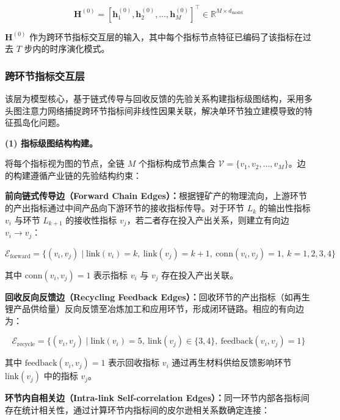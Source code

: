 \begin{equation}
\mathbf{H}^{(0)} = \left[\mathbf{h}_1^{(0)},\mathbf{h}_2^{(0)},\ldots,\mathbf{h}_M^{(0)}\right]^{\top} \in \mathbb{R}^{M \times d_{\text{model}}}
\end{equation}

$\mathbf{H}^{(0)}$ 作为跨环节指标交互层的输入，其中每个指标节点特征已编码了该指标在过去 $T$ 步内的时序演化模式。

\subsubsection{跨环节指标交互层}

该层为模型核心，基于链式传导与回收反馈的先验关系构建指标级图结构，采用多头图注意力网络捕捉跨环节指标间非线性因果关联，解决单环节独立建模导致的特征孤岛化问题。

\textbf{(1) 指标级图结构构建。}

将每个指标视为图的节点，全链 $M$ 个指标构成节点集合 $\mathcal{V}=\{v_1,v_2,\ldots,v_M\}$。边的构建遵循产业链的先验结构约束：

\textbf{前向链式传导边（Forward Chain Edges）：}根据锂矿产的物理流向，上游环节的产出指标通过中间产品向下游环节的接收指标传导。对于环节 $L_k$ 的输出性指标 $v_i$ 与环节 $L_{k+1}$ 的接收性指标 $v_j$，若二者存在投入产出关系，则建立有向边 $v_i\to v_j$：

\begin{equation}
\mathcal{E}_{\text{forward}} = \{(v_i, v_j) \mid \text{link}(v_i)=k,\ \text{link}(v_j)=k+1,\ \text{conn}(v_i,v_j)=1,\ k=1,2,3,4\}
\end{equation}

其中 $\text{conn}(v_i,v_j)=1$ 表示指标 $v_i$ 与 $v_j$ 存在投入产出关联。

\textbf{回收反向反馈边（Recycling Feedback Edges）：}回收环节的产出指标（如再生锂产品供给量）反向反馈至冶炼加工和应用环节，形成闭环链路。相应的有向边为：

\begin{equation}
\mathcal{E}_{\text{recycle}} = \{(v_i, v_j) \mid \text{link}(v_i)=5,\ \text{link}(v_j)\in\{3,4\},\ \text{feedback}(v_i,v_j)=1\}
\end{equation}

其中 $\text{feedback}(v_i,v_j)=1$ 表示回收指标 $v_i$ 通过再生材料供给反馈影响环节 $\text{link}(v_j)$ 中的指标 $v_j$。

\textbf{环节内自相关边（Intra-link Self-correlation Edges）：}同一环节内部各指标间存在统计相关性，通过计算环节内指标间的皮尔逊相关系数确定连接：

